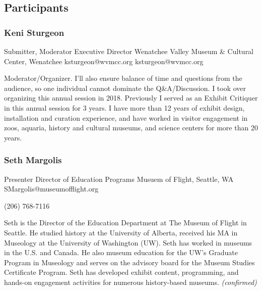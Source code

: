 \documentclass{report}
\begin{document}
            \subsection*{Participants}
              \subsubsection*{ Keni Sturgeon }
              Submitter, Moderator\newline
              Executive Director\newline
              Wenatchee Valley Museum \& Cultural Center, Wenatchee
              \newline
              ksturgeon@wvmcc.org\newline
              ksturgeon@wvmcc.org\newline

              Moderator/Organizer. I'll also ensure balance of time and questions from the audience, so one individual cannot dominate the Q\&A/Discussion. I took over organizing this annual session in 2018.  Previously I served as an Exhibit Critiquer in this annual session for 3 years. I have more than 12 years of exhibit design, installation and curation experience, and have worked in visitor engagement in zoos, aquaria, history and cultural museums, and science centers for more than 20 years.\newline


              

              
                \subsubsection*{ Seth  Margolis }
                Presenter\newline
                Director of Education Programs\newline
                Musuem of Flight, Seattle, WA
                \newline
                SMargolis@museumofflight.org\newline
                
                (206) 768-7116\newline

                Seth is the Director of the Education Department at The Museum of Flight in Seattle. He studied history at the University of Alberta, received his MA in Museology at the University of Washington (UW). Seth has worked in museums in the U.S. and Canada. He also museum education for the UW’s Graduate Program in Museology and serves on the advisory board for the Museum Studies Certificate Program. Seth has developed exhibit content, programming, and hands-on engagement activities for numerous history-based museums.
                \emph{ (confirmed) }
              
\end{document}
